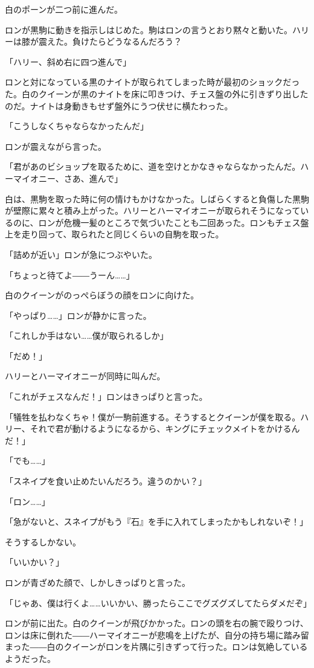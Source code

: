 \documentclass[10pt,a4paper]{article}
\begin{document}
\begin{CJK}{UTF8}{min}
白のポーンが二つ前に進んだ。

ロンが黒駒に動きを指示しはじめた。駒はロンの言うとおり黙々と動いた。ハリーは膝が震えた。負けたらどうなるんだろう？

「ハリー、斜め右に四つ進んで」

ロンと対になっている黒のナイトが取られてしまった時が最初のショックだった。白のクイーンが黒のナイトを床に叩きつけ、チェス盤の外に引きずり出したのだ。ナイトは身動きもせず盤外にうつ伏せに横たわった。

「こうしなくちゃならなかったんだ」

ロンが震えながら言った。

「君があのビショップを取るために、道を空けとかなきゃならなかったんだ。ハーマイオニー、さあ、進んで」

白は、黒駒を取った時に何の情けもかけなかった。しばらくすると負傷した黒駒が壁際に累々と積み上がった。ハリーとハーマイオニーが取られそうになっているのに、ロンが危機一髪のところで気づいたことも二回あった。ロンもチェス盤上を走り回って、取られたと同じくらいの自駒を取った。

「詰めが近い」ロンが急につぶやいた。

「ちょっと待てよ――うーん……」

白のクイーンがのっぺらぼうの顔をロンに向けた。

「やっぱり……」ロンが静かに言った。

「これしか手はない……僕が取られるしか」

「だめ！」

ハリーとハーマイオニーが同時に叫んだ。

「これがチェスなんだ！」ロンはきっぱりと言った。

「犠牲を払わなくちゃ！僕が一駒前進する。そうするとクイーンが僕を取る。ハリー、それで君が動けるようになるから、キングにチェックメイトをかけるんだ！」

「でも……」

「スネイプを食い止めたいんだろう。違うのかい？」

「ロン……」

「急がないと、スネイプがもう『石』を手に入れてしまったかもしれないぞ！」

そうするしかない。

「いいかい？」

ロンが青ざめた顔で、しかしきっぱりと言った。

「じゃあ、僕は行くよ……いいかい、勝ったらここでグズグズしてたらダメだぞ」

ロンが前に出た。白のクイーンが飛びかかった。ロンの頭を右の腕で殴りつけ、ロンは床に倒れた――ハーマイオニーが悲鳴を上げたが、自分の持ち場に踏み留まった――白のクイーンがロンを片隅に引きずって行った。ロンは気絶しているようだった。


\end{CJK}
\end{document}
